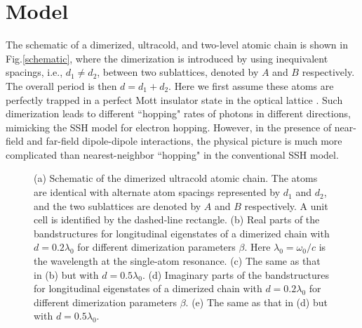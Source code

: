\documentclass[aps,pra,reprint,groupedaddress,nofootinbib,longbibliography,showpacs]{revtex4-1}
\begin{document}
\section{Model}\label{model}
The schematic of a dimerized, ultracold, and two-level atomic chain is shown in Fig.\ref{schematic}, where the dimerization is introduced by using inequivalent spacings, i.e., $d_1\neq d_2$, between two sublattices, denoted by $A$ and $B$ respectively. The overall period is then $d=d_1+d_2$.  Here we first assume these atoms are perfectly trapped in a perfect Mott insulator state in the optical lattice \cite{antezzaPRA2009,yelinPRL20172}. Such dimerization leads to different ``hopping" rates of photons in different directions, mimicking the SSH model for electron hopping.  However, in the presence of near-field and far-field dipole-dipole interactions, the physical picture is much more complicated than nearest-neighbor ``hopping" in the conventional SSH model.
\begin{figure}[htbp]
	\centering
	\hspace{0.01in}
	\flushleft
	\hspace{0.01in}
	\hspace{0.01in}
\hspace{0.01in}
	\caption{(a) Schematic of the dimerized ultracold atomic chain. The atoms are identical with alternate atom spacings represented by $d_1$ and $d_2$, and the two sublattices are denoted by $A$ and $B$ respectively. A unit cell is identified by the dashed-line rectangle. (b) Real parts of the bandstructures for longitudinal eigenstates of a dimerized chain with $d=0.2\lambda_0$ for different dimerization parameters $\beta$. Here $\lambda_0=\omega_0/c$ is the wavelength at the single-atom resonance. (c) The same as that in (b) but with $d=0.5\lambda_0$. (d) Imaginary parts of the bandstructures for longitudinal eigenstates of a dimerized chain with $d=0.2\lambda_0$ for different dimerization parameters $\beta$. (e) The same as that in (d) but with $d=0.5\lambda_0$.}\label{figcda}
\end{figure}
\end{document}
